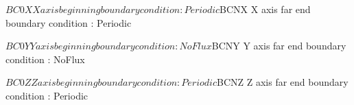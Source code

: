 $BC0X   X axis beginning boundary condition  : Periodic
$BCNX   X axis far end boundary condition    : Periodic

$BC0Y   Y axis beginning boundary condition  : NoFlux
$BCNY   Y axis far end boundary condition    : NoFlux

$BC0Z   Z axis beginning boundary condition  : Periodic
$BCNZ   Z axis far end boundary condition    : Periodic

